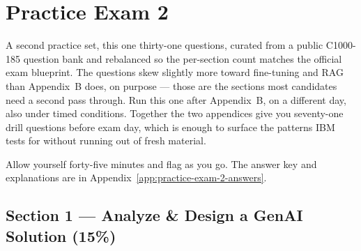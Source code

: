 \chapter{Practice Exam 2}
\label{app:practice-exam-2}

A second practice set, this one thirty-one questions, curated from a
public C1000-185 question bank and rebalanced so the per-section count
matches the official exam blueprint. The questions skew slightly more
toward fine-tuning and RAG than Appendix~B does, on purpose --- those are
the sections most candidates need a second pass through. Run this one after
Appendix~B, on a different day, also under timed conditions. Together the
two appendices give you seventy-one drill questions before exam day, which
is enough to surface the patterns IBM tests for without running out of
fresh material.

Allow yourself forty-five minutes and flag as you go. The answer key
and explanations are in Appendix~\ref{app:practice-exam-2-answers}.

\section*{Section 1 --- Analyze \& Design a GenAI Solution (15\%)}

